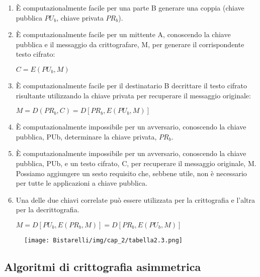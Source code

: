 \begin{enumerate}
    \item È computazionalmente facile per una parte B generare una coppia (chiave pubblica $PU_b$, chiave privata $PR_b$).
    
    \item È computazionalmente facile per un mittente A, conoscendo la chiave pubblica e il messaggio da crittografare, M, per generare il corrispondente testo cifrato:
    
    \begin{center}
         $C = E(PU_b, M)$
    \end{center}
    
    \item È computazionalmente facile per il destinatario B decrittare il testo cifrato risultante utilizzando la chiave privata per recuperare il messaggio originale:
    
    \begin{center}
        $M = D(PR_b, C) = D[PR_b, E(PU_b, M)]$
    \end{center}
    
    \item È computazionalmente impossibile per un avversario, conoscendo la chiave pubblica, PUb, determinare la chiave privata, $PR_b$.
    
    \item  È computazionalmente impossibile per un avversario, conoscendo la chiave pubblica, PUb, e un testo cifrato, C, per recuperare il messaggio originale, M. Possiamo aggiungere un sesto requisito che, sebbene utile, non è necessario per tutte le applicazioni a chiave pubblica.
    
    \item Una delle due chiavi correlate può essere utilizzata per la crittografia e l'altra per la decrittografia.
    
    \begin{center}
        $M = D[PU_b, E(PR_b, M)] = D[PR_b, E(PU_b, M)]$
    \end{center}
\end{enumerate}

\begin{figure}[H]
	\centering
    \texttt{[image: Bistarelli/img/cap\_2/tabella2.3.png]}
\end{figure}

\newpage
\subsection{Algoritmi di crittografia asimmetrica}
